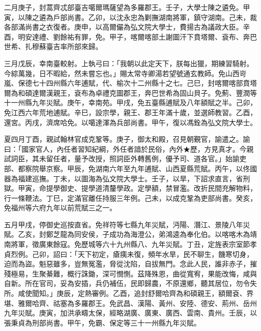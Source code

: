 \begin{pinyinscope}
二月庚子，封蒿齊忒部臺吉噶爾瑪薩望為多羅郡王。壬子，大學士陳之遴免。甲寅，以陳之遴為戶部尚書。乙卯，以沈永忠為剿撫湖南將軍，鎮守湖南。己未，裁各部滿尚書之衣復者。庚申，以高爾儼為弘文院大學士，費揚古為議政大臣。辛酉，明安達禮、劉餘祐有罪，免。甲子，喀爾喀部土謝圖汗下賁塔爾、袞布、奔巴世希、扎穆蘇臺吉率所部來歸。

三月戊辰，幸南臺較射。上執弓曰：「我朝以此定天下，朕每出獵，期練習騎射。今綜萬幾，日不暇給，然未嘗忘也。」賜太常寺卿湯若望號通玄教師。免山西岢嵐、保德七十四州縣六年逋賦，代、榆次十二州縣十之七。己巳，封喀爾喀部賁塔爾為和碩達爾漢親王，袞布為卓禮克圖郡王，奔巴世希為固山貝子。免薊、豐潤等十一州縣九年災賦。庚午，幸南苑。甲戌，免五臺縣逋賦及八年額賦之半。己卯，免江西六年荒地逋賦。辛巳，設宗學，親王、郡王年滿十歲，並選師教習。乙酉，還宮。丙戌，濟席哈免。以噶達渾為兵部尚書。甲午，復以馮銓為弘文院大學士。

夏四月丁酉，親試翰林官成克鞏等。庚子，御太和殿，召見朝覲官，諭遣之。諭曰：「國家官人，內任者習知紀綱，外任者諳於民俗，內外★歷，方見真才。今親試詞臣，其未留任者，量予改授，照詞臣外轉舊例，優予司、道各官。」始諭吏部、都察院舉京察。甲辰，免湖南六年至九年逋賦、山西夏縣荒賦。丙午，以佟國器為福建巡撫。丁未，以圖海為弘文院大學士。壬子，以旱，下詔求直言，省刑獄。甲寅，命提學御史、提學道清釐學政。定學額，禁冒濫。改折民間充解物料，行一條鞭法。丁巳，定滿官離任持服三年例。己未，以成克鞏為吏部尚書。癸亥，免福州等六府九年以前荒賦三之一。

五月甲戌，停御史巡按直省。免祥符等七縣九年災賦，沔陽、潛江、景陵八年災賦。乙亥，封鄭芝龍為同安侯，子成功為海澄公，弟鴻逵為奉化伯。以喀喀木為靖南將軍，徵廣東餘寇。免歷城等六十九州縣八、九年災賦。丁丑，定旌表宗室節孝貞烈例。己卯，詔曰：「天下初定，瘡痍未復，頻年水旱，民不聊生，饑寒切身，迫而為盜。魁惡雖多，豈無冤濫，脅從沈陷，自拔無門。念此人民，誰非赤子，摧殘極易，生聚綦難，概行誅鋤，深可憫惻。茲降殊恩，曲從寬宥，果能改悔，咸與自新。所在官司，妥為安插，兵仍補伍，民即歸農，不原還鄉，聽其居位，勿令失所。咸使聞知。」庚辰，定熱審例。乙酉，追封舒爾哈齊為和碩親王，額爾袞、界堪、雅爾哈齊、祜塞為多羅郡王。免武昌、漢陽、黃州、安陸、德安、荊州、岳州九年災賦。庚寅，加洪承疇太保，經略湖廣、廣東、廣西、雲南、貴州。壬辰，以張秉貞為刑部尚書。甲午，免霸、保定等三十一州縣九年災賦。


\end{pinyinscope}
